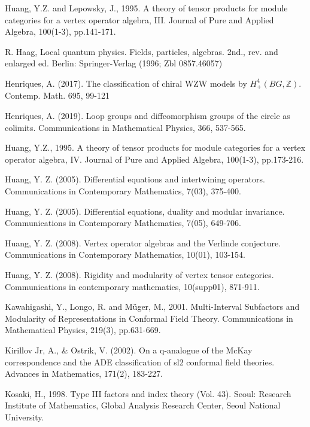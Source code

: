 \documentclass[11pt,b5paper,notitlepage]{article}
\theoremstyle{definition}
\theoremstyle{plain}
\numberwithin{equation}{section}
\begin{document}
\begin{thebibliography}{999999}
Huang, Y.Z. and Lepowsky, J., 1995. A theory of tensor products for module categories
for a vertex operator algebra, III. Journal of Pure and Applied Algebra, 100(1-3), pp.141-171.

R. Haag, Local quantum physics. Fields, particles, algebras. 2nd., rev. and enlarged ed. Berlin: Springer-Verlag (1996; Zbl 0857.46057)

Henriques, A. (2017). The classification of chiral WZW models by  $H^4_+(BG,\mathbb Z) $. Contemp. Math. 695, 99-121

Henriques, A. (2019). Loop groups and diffeomorphism groups of the circle as colimits. Communications in Mathematical Physics, 366, 537-565.


Huang, Y.Z., 1995. A theory of tensor products for module categories for a vertex operator algebra, IV. Journal of Pure and Applied Algebra, 100(1-3), pp.173-216.






Huang, Y. Z. (2005). Differential equations and intertwining operators. Communications in Contemporary Mathematics, 7(03), 375-400.

Huang, Y. Z. (2005). Differential equations, duality and modular invariance. Communications in Contemporary Mathematics, 7(05), 649-706.


Huang, Y. Z. (2008). Vertex operator algebras and the Verlinde conjecture. Communications in Contemporary Mathematics, 10(01), 103-154.

Huang, Y. Z. (2008). Rigidity and modularity of vertex tensor categories. Communications in contemporary mathematics, 10(supp01), 871-911.





Kawahigashi, Y., Longo, R. and M\"uger, M., 2001. Multi-Interval Subfactors and Modularity of Representations in Conformal Field Theory. Communications in Mathematical Physics, 219(3), pp.631-669.


Kirillov Jr, A., \& Ostrik, V. (2002). On a q-analogue of the McKay correspondence and the ADE classification of sl2 conformal field theories. Advances in Mathematics, 171(2), 183-227.

Kosaki, H., 1998. Type III factors and index theory (Vol. 43). Seoul: Research Institute of Mathematics, Global Analysis Research Center, Seoul National University.


\end{thebibliography}
\end{document}
